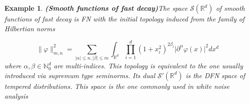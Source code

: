 \documentclass[12pt]{article}%
\newtheorem{example}{Example}%
\begin{document}
\begin{example}{\bf (Smooth functions of fast decay)}\label{ex:schwartFunctions} The space $\mathcal{S}(\mathbb{R}^d)$ of smooth functions of fast decay is FN with the initial topology induced from the family of Hilbertian norms

    \begin{equation}
        \label{eq:hilbertianNormsSchwartz}
        \lVert\varphi\rVert_{m,n}^2=\sum_{\lvert\alpha\rvert\leq n, \lvert\beta\rvert\leq m}\int_{\mathbb{R}^d}\prod_{i=1}^d(1+x_i^2)^{2\beta_i}\lvert \partial^\alpha\varphi(x)\rvert^2 dx^d
    \end{equation}
    where $\alpha,\beta\in \mathbb{N}_0^d$ are multi-indices. This topology is equivalent to the one usually introduced via supremum type seminorms. Its dual $\mathcal{S}'(\mathbb{R}^d)$ is the DFN space of tempered distributions. This space is the one commonly used in white noise analysis \cite{Hida1993}  
\end{example}
\end{document}
